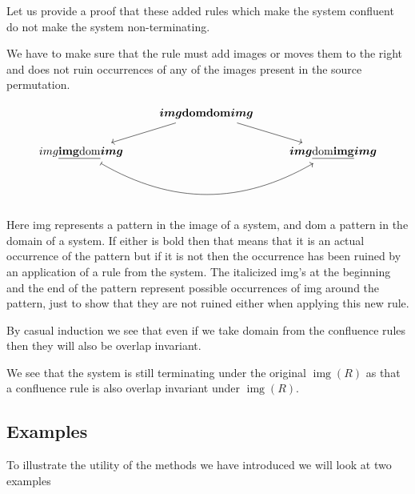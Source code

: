 \documentclass[a4paper, 11pt, english]{article}
\theoremstyle{definition}
\DeclareMathOperator{\img}{img}
\begin{document}
Let us provide a proof that these added rules which make the system confluent do
not make the system non-terminating.
 
We have to make sure that the rule must add images or moves them to the right and does not ruin
occurrences of any of the images present in the source permutation.

\[
\begin{tikzcd}  
    & \bm{img}\mathbf{domdom}\bm{img} \arrow[dl] \arrow[dr] & \\
    img\underline{\mathbf{img}\mathrm{dom}}\bm{img} \arrow[bend
    right=30, mapsto]{rr} & & \bm{img}\underline{\mathrm{dom}\mathbf{img}}\bm{img}
\end{tikzcd}
\]

Here img represents a pattern in the image of a system, and dom a pattern in the domain of a system.
If either is bold then that means that it is an actual occurrence of the pattern but if it is not
then the occurrence has been ruined by an application of a rule from the system. The italicized
img's at the beginning and the end of the pattern represent possible occurrences of img around the
pattern, just to show that they are not ruined either when applying this new rule.

By casual induction we see that even if we take domain from the confluence rules
then they will also be overlap invariant.

We see that the system is still terminating under the original $\img(R)$ as
that a confluence rule is also overlap invariant under $\img(R)$.

\subsection{Examples}
To illustrate the utility of the methods we have introduced we will look at two
examples
\end{document}
